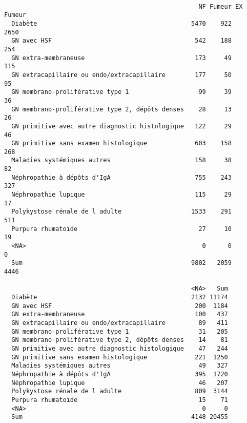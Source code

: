 \documentclass[11pt,a4paper]{article}\usepackage[]{graphicx}\usepackage[]{color}
\makeatletter
\newenvironment{kframe}{%
 \def\at@end@of@kframe{}%
 \ifinner\ifhmode%
  \def\at@end@of@kframe{\end{minipage}}%
  \begin{minipage}{\columnwidth}%
 \fi\fi%
 \def\FrameCommand##1{\hskip\@totalleftmargin \hskip-\fboxsep
 \colorbox{shadecolor}{##1}\hskip-\fboxsep
     \hskip-\linewidth \hskip-\@totalleftmargin \hskip\columnwidth}%
 \MakeFramed {\advance\hsize-\width
   \@totalleftmargin\z@ \linewidth\hsize
   \@setminipage}}%
 {\par\unskip\endMakeFramed%
 \at@end@of@kframe}
\newenvironment{knitrout}{}{} %
\makeatother
\begin{document}
\begin{knitrout}
\color{fgcolor}\begin{kframe}
\begin{verbatim}
                                                 
                                                     NF Fumeur EX Fumeur
  Diabète                                          5470    922      2650
  GN avec HSF                                       542    188       254
  GN extra-membraneuse                              173     49       115
  GN extracapillaire ou endo/extracapillaire        177     50        95
  GN membrano-proliférative type 1                   99     39        36
  GN membrano-proliférative type 2, dépôts denses    28     13        26
  GN primitive avec autre diagnostic histologique   122     29        46
  GN primitive sans examen histologique             603    158       268
  Maladies systémiques autres                       158     38        82
  Néphropathie à dépôts d'IgA                       755    243       327
  Néphropathie lupique                              115     29        17
  Polykystose rénale de l adulte                   1533    291       511
  Purpura rhumatoïde                                 27     10        19
  <NA>                                                0      0         0
  Sum                                              9802   2059      4446
                                                 
                                                   <NA>   Sum
  Diabète                                          2132 11174
  GN avec HSF                                       200  1184
  GN extra-membraneuse                              100   437
  GN extracapillaire ou endo/extracapillaire         89   411
  GN membrano-proliférative type 1                   31   205
  GN membrano-proliférative type 2, dépôts denses    14    81
  GN primitive avec autre diagnostic histologique    47   244
  GN primitive sans examen histologique             221  1250
  Maladies systémiques autres                        49   327
  Néphropathie à dépôts d'IgA                       395  1720
  Néphropathie lupique                               46   207
  Polykystose rénale de l adulte                    809  3144
  Purpura rhumatoïde                                 15    71
  <NA>                                                0     0
  Sum                                              4148 20455
                                                 

\end{verbatim}
\end{kframe}
\end{knitrout}
\end{document}
